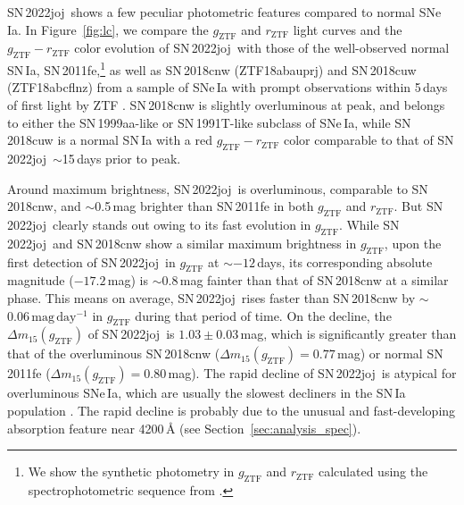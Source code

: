 \documentclass[twocolumn]{aastex631}
\newcommand{\sn}{SN\,2022joj}
\begin{document}
\begin{CJK*}{UTF8}{gbsn}
\sn\ shows a few peculiar photometric features compared to normal SNe\,Ia. In Figure~\ref{fig:lc}, we compare the $g_\mathrm{ZTF}$ and $r_\mathrm{ZTF}$ light curves and the $g_\mathrm{ZTF} - r_\mathrm{ZTF}$ color evolution of \sn\ with those of the well-observed normal SN\,Ia, SN\,2011fe,\footnote{We show the synthetic photometry in $g_\mathrm{ZTF}$ and $r_\mathrm{ZTF}$ calculated using the spectrophotometric sequence from \citet{Pereira_2013}.} as well as SN\,2018cnw (ZTF18abauprj) and SN\,2018cuw (ZTF18abcflnz) from a sample of SNe\,Ia with prompt observations within 5\,days of first light by ZTF \citep{Yao_2019,Bulla2020}. 
SN\,2018cnw is slightly overluminous at peak, and belongs to either the SN\,1999aa-like \citep[99aa-like;][]{Garavini_99aa_2004} or SN\,1991T-like \citep[91T-like;][]{Filippenko_91T_1992} subclass of SNe\,Ia, while SN\,2018cuw is a normal SN\,Ia with a red $g_\mathrm{ZTF} - r_\mathrm{ZTF}$ color comparable to that of \sn\ $\sim$15\,days prior to peak. 

Around maximum brightness, \sn\ is overluminous, comparable to SN\,2018cnw, and $\sim$0.5\,mag brighter than SN\,2011fe in both $g_\mathrm{ZTF}$ and $r_\mathrm{ZTF}$. But \sn\ clearly stands out owing to its fast evolution in $g_\mathrm{ZTF}$. While \sn\ and SN\,2018cnw show a similar maximum brightness in $g_\mathrm{ZTF}$, upon the first detection of \sn\ in $g_\mathrm{ZTF}$ at $\sim$$-12$\,days, its corresponding absolute magnitude ($-17.2$\,mag) is $\sim$0.8\,mag fainter than that of SN\,2018cnw at a similar phase. This means on average, \sn\ rises faster than SN\,2018cnw by $\sim$$0.06\,\mathrm{mag\,day^{-1}}$ in $g_\mathrm{ZTF}$ during that period of time. On the decline, the $\Delta m_{15}(g_\mathrm{ZTF})$ of \sn\ is $1.03\pm0.03$\,mag, which is significantly greater than that of the overluminous SN\,2018cnw ($\Delta m_{15}(g_\mathrm{ZTF})=0.77$\,mag) or normal SN\,2011fe ($\Delta m_{15}(g_\mathrm{ZTF})=0.80$\,mag). The rapid decline of \sn\ is atypical for overluminous SNe\,Ia, which are usually the slowest decliners in the SN\,Ia population \citep{Phillips_1999, Taubenberger_2017}. The rapid decline is probably due to the unusual and fast-developing absorption feature near 4200\,\r{A} (see Section~\ref{sec:analysis_spec}).


\end{CJK*}
\end{document}
